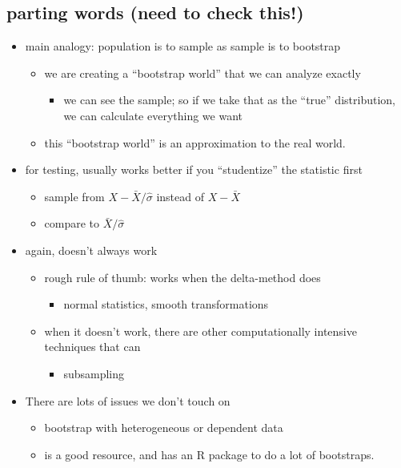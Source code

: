 \subsection{parting words (need to check this!)}

\begin{itemize}
\item main analogy: population is to sample as sample is to bootstrap
\begin{itemize}
\item we are creating a ``bootstrap world'' that we can analyze
         exactly
\begin{itemize}
\item we can see the sample; so if we take that as the ``true''
           distribution, we can calculate everything we want
\end{itemize}
\item this ``bootstrap world'' is an approximation to the real world.
\end{itemize}
\item for testing, usually works better if you ``studentize'' the
       statistic first
\begin{itemize}
\item sample from $X - \bar X / \hat\sigma$ instead of $X - \bar X$
\item compare to $\bar X / \hat\sigma$
\end{itemize}
\item again, doesn't always work
\begin{itemize}
\item rough rule of thumb: works when the delta-method does
\begin{itemize}
\item normal statistics, smooth transformations
\end{itemize}
\item when it doesn't work, there are other computationally
         intensive techniques that can
\begin{itemize}
\item subsampling
\end{itemize}
\end{itemize}
\item There are lots of issues we don't touch on
\begin{itemize}
\item bootstrap with heterogeneous or dependent data
\item \citet{DaH_1997} is a good resource, and has an R package to do a lot
  of bootstraps.
\end{itemize}
\end{itemize}

